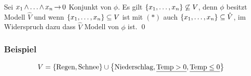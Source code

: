 Sei $x_1\operatorname{\wedge}\dots\operatorname{\wedge} x_n \operatorname{\rightarrow} 0$ Konjunkt von $\phi$. Es gilt
$\left\{x_1,\dots,x_n\right\} \not\subseteq V$, denn $\phi$ besitzt Modell $\hat{V}$ und
wenn $\left\{x_1,\dots,x_n\right\}\subseteq V$ ist mit $(*)$ auch
$\left\{x_1,\dots,x_n\right\} \subseteq \hat{V}$, im Widerspruch dazu dass $\hat{V}$ Modell
von $\phi$ ist. \qed

\subsubsection{Beispiel}

\[
  V=\left\{\text{Regen}, \text{Schnee}\right\} \cup \left\{\text{Niederschlag}, \underline{\text{Temp}>0}, \underline{\text{Temp}\leq 0}\right\}
\]
